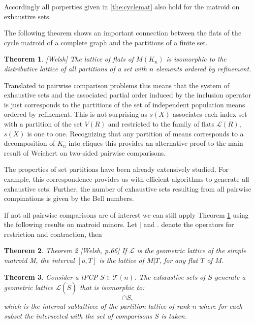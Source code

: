 \documentclass[a4paper,12pt]{article}
\newtheorem{theorem}{Theorem}
\begin{document}
Accordingly all porperties given in \ref{the:cyclemat} also hold for
the matroid on exhaustive sets. 

The following theorem shows an important connection between the flats
of the cycle matroid of a complete graph and the partitions of a
finite set. 

\begin{theorem}{[Welsh]}
\label{the:partition.lattice}
  The lattice of flats of $M(K_n)$ is isomorphic to the distributive
  lattice of all partitions of a set with $n$ elements ordered by
  refinement. 
\end{theorem}

Translated to pairwise comparison problems this means that the system
of exhaustive sets and the associated partial order induced by the 
inclusion operator is just corresponds to the partitions of the set of
independent population means ordered by refinement. This is not
surprising as $s(X)$ associates each index set with a partition of the
set $V(R)$ and restricted to the family of flats $\mathcal{L}(R)$,
$s(X)$ is one to one. Recognizing that any partition of means
corresponds to a decomposition of $K_n$ into cliques this provides an
alternative proof to the main result of Weichert on two-sided pairwise
comparisons. 

The properties of set partitions have been already extensively
studied. For example, this correspondence provides us with efficient
algorithms to generate all exhaustive sets. Further, the number of
exhaustive sets resulting from all pairwise compinations is given by
the Bell numbers.

If not all pairwise comparisons are of interest we can still apply
Theorem \ref{the:partition.lattice} using the following results on
matroid minors. Let $|$ and $.$ denote the operators for restriction
and contraction, then

\begin{theorem}{Theorem 2 [Welsh, p.66]}
  If $\mathcal{L}$ is the geometric lattice of the simple matroid M,
  the interval $[o,T]$ is the lattice of $M|T$, for any flat $T$ of
  $M$. 
\end{theorem}

\begin{theorem}
\label{the:interval}
  Consider a tPCP $\dot{S} \in \dot{\mathcal{T}}(n)$. The exhaustive
  sets of $\dot{S}$ generate a geometric lattice
  $\mathcal{L}(\dot{S})$ that is isomorphic to: 
  \begin{displaymath}
    [\emptyset,\sigma_{K_n} S] \cap S,
  \end{displaymath}
  which is the interval sublatticee of the partition lattice of rank
  $n$ where for each subset the intersected with the set of
  comparisons $S$ is taken. 
\end{theorem}
\end{document}
